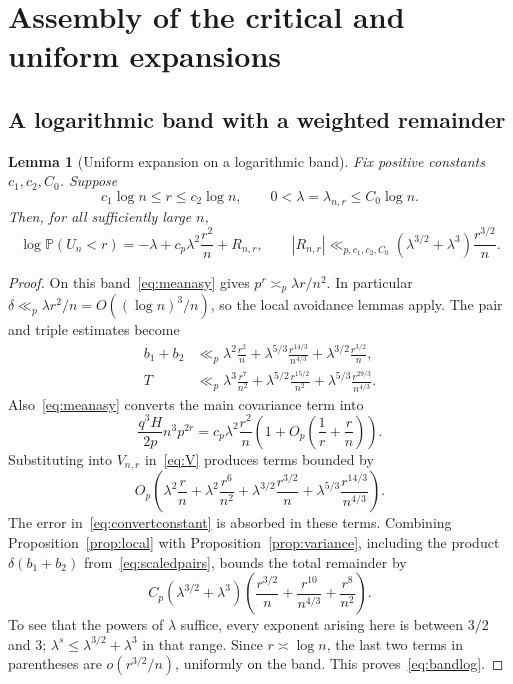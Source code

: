\documentclass[11pt]{article}
\newtheorem{lemma}[theorem]{Lemma}
\theoremstyle{definition}\newtheorem{definition}[theorem]{Definition}
\theoremstyle{remark}\newtheorem{remark}[theorem]{Remark}
\newcommand{\PP}{\mathbb P}
\newcommand{\la}{\lambda}
\begin{document}
\section{Assembly of the critical and uniform expansions}\label{sec:assembly}
\subsection{A logarithmic band with a weighted remainder}
\begin{lemma}[Uniform expansion on a logarithmic band]\label{lem:band}
Fix positive constants $c_1,c_2,C_0$. Suppose
\[
 c_1\log n\le r\le c_2\log n,\qquad
 0<\la=\la_{n,r}\le C_0\log n.
\]
Then, for all sufficiently large $n$,
\begin{equation}
 \log\PP(U_n<r)
 =-\la+c_p\la^2\frac{r^2}{n}+R_{n,r},\qquad
 |R_{n,r}|\ll_{p,c_1,c_2,C_0}
       (\la^{3/2}+\la^3)\frac{r^{3/2}}n.
 \label{eq:bandlog}
\end{equation}
\end{lemma}
\begin{proof}
On this band~\eqref{eq:meanasy} gives
$p^r\asymp_p\la r/n^2$. In particular
$\delta\ll_p\la r^2/n=O((\log n)^3/n)$, so the local avoidance
lemmas apply. The pair and triple estimates become
\begin{align}
 b_1+b_2&\ll_p
       \la^2\frac{r^2}{n}
       +\la^{5/3}\frac{r^{14/3}}{n^{4/3}}
       +\la^{3/2}\frac{r^{3/2}}n,\label{eq:scaledpairs}\\
 T&\ll_p
       \la^3\frac{r^7}{n^2}
       +\la^{5/2}\frac{r^{15/2}}{n^2}
       +\la^{5/3}\frac{r^{29/3}}{n^{4/3}}.\label{eq:scaledtriples}
\end{align}
Also~\eqref{eq:meanasy} converts the main covariance term into
\begin{equation}
 \frac{q^3H}{2p}n^3p^{2r}
 =c_p\la^2\frac{r^2}n
       \left(1+O_p\left(\frac1r+\frac rn\right)\right).
 \label{eq:convertconstant}
\end{equation}
Substituting into $V_{n,r}$ in~\eqref{eq:V} produces terms bounded by
\[
 O_p\left(
  \la^2\frac rn+\la^2\frac{r^6}{n^2}
  +\la^{3/2}\frac{r^{3/2}}n
  +\la^{5/3}\frac{r^{14/3}}{n^{4/3}}\right).
\]
The error in~\eqref{eq:convertconstant} is absorbed in these terms.
Combining Proposition~\ref{prop:local} with
Proposition~\ref{prop:variance}, including the product
$\delta(b_1+b_2)$ from~\eqref{eq:scaledpairs}, bounds the total
remainder by
\begin{equation}
 C_p(\la^{3/2}+\la^3)
 \left(\frac{r^{3/2}}n+\frac{r^{10}}{n^{4/3}}
                               +\frac{r^8}{n^2}\right).
 \label{eq:unabsorbed}
\end{equation}
To see that the powers of $\la$ suffice, every exponent arising here is
between $3/2$ and $3$; $\la^s\le\la^{3/2}+\la^3$ in that range.
Since $r\asymp\log n$, the last two terms in parentheses are
$o(r^{3/2}/n)$, uniformly on the band. This proves~\eqref{eq:bandlog}.
\end{proof}
\end{document}
